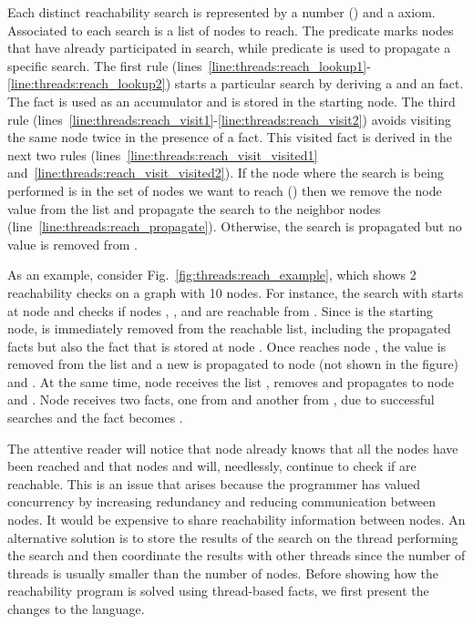 Each distinct reachability search is represented by a number () and a
 axiom. Associated to each search  is a list of nodes to
reach.  The predicate  marks nodes that have already
participated in search, while predicate  is used to propagate a
specific search. The first rule
(lines~\ref{line:threads:reach_lookup1}-\ref{line:threads:reach_lookup2}) starts
a particular search by deriving a  and an  fact.
The  fact is used as an accumulator and is stored in the starting
node. The third rule
(lines~\ref{line:threads:reach_visit1}-\ref{line:threads:reach_visit2}) avoids
visiting the same node twice in the presence of a  fact.  This
visited fact is derived in the next two rules
(lines~\ref{line:threads:reach_visit_visited1}
and~\ref{line:threads:reach_visit_visited2}).  If the node where the search is
being performed is in the set of nodes we want to reach () then we
remove the node value from the list and propagate the search to the neighbor
nodes (line~\ref{line:threads:reach_propagate}).  Otherwise, the search is
propagated but no value is removed from .

As an example, consider Fig.~\ref{fig:threads:reach_example}, which shows 2
reachability checks on a graph with 10 nodes. For instance, the search with
 starts at node  and checks if nodes , ,
and  are reachable from . Since  is the starting
node,  is immediately removed from the reachable list, including the
propagated  facts but also the  fact that is stored
at node . Once  reaches node , the value
 is removed from the list and a new  is propagated to
node  (not shown in the figure) and . At the same time, node
 receives the list \code{[2,3]}, removes  and propagates
\code{[3]} to node  and . Node  receives two
 facts, one from  and another from , due to
successful searches and the  fact becomes .

The attentive reader will notice that node  already knows that all the
nodes have been reached and that nodes  and  will, needlessly,
continue to check if \code{[2,3]} are reachable. This is an issue that arises
because the programmer has valued concurrency by increasing redundancy and
reducing communication between nodes. It would be expensive to share
reachability information between nodes. An alternative solution is to store the
results of the search on the thread performing the search and then coordinate
the results with other threads since the number of threads is usually smaller
than the number of nodes. Before showing how the reachability program is solved
using thread-based facts, we first present the changes to the language.

